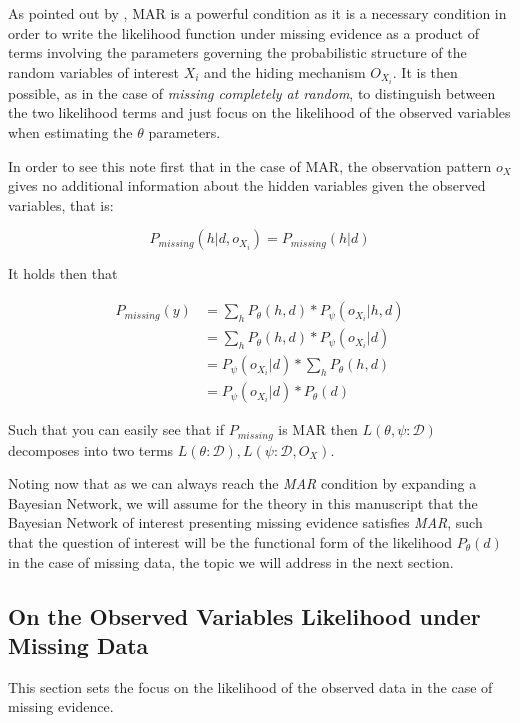 \documentclass[11pt]{article}
\begin{document}
\begin{article}
As pointed out by \cite{koller2009probabilistic}, MAR is a powerful
condition as it is a necessary condition in order to write the
likelihood function under missing evidence as a product of terms
involving the parameters governing the probabilistic structure of
the random variables of interest \(X_i\) and the hiding mechanism
\(O_{X_i}\). It is then possible, as in the case of \emph{missing
completely at random}, to distinguish between the two likelihood
terms and just focus on the likelihood of the observed variables
when estimating the \(\theta\) parameters.

In order to see this note first that in the case of MAR, the
observation pattern \(o_X\) gives no additional information about the
hidden variables given the observed variables, that is:

$$ P_{missing} (h | d, o_{X_i}) =  P_{missing} (h | d) $$

It holds then that 


\begin{align}
P_{missing}(y) &= \sum_h P_{\theta} (h, d) * P_\psi(o_{X_i} | h, d) \nonumber \\
             &= \sum_h P_{\theta} (h, d) * P_\psi(o_{X_i} | d) \nonumber \\
             &= P_\psi(o_{X_i} | d) * \sum_h P_{\theta} (h, d)  \nonumber \\
	     &= P_\psi(o_{X_i} | d) * P_{\theta} (d)  \nonumber		
\end{align}

Such that you can easily see that if \(P_{missing}\) is MAR then
\(L(\theta, \psi : \mathscr{D})\) decomposes into two terms \(L(\theta :
   \mathscr{D}), L(\psi : \mathscr{D}, O_X)\).

Noting now that as we can always reach the \emph{MAR} condition by
expanding a Bayesian Network, we will assume for the theory in this
manuscript that the Bayesian Network of interest presenting missing
evidence satisfies \emph{MAR}, such that the question of interest will
be the functional form of the likelihood \(P_{\theta} (d)\) in the
case of missing data, the topic we will address in the next
section.

\subsection{On the Observed Variables Likelihood under Missing Data}
\label{sec:org7df83e2}

This section sets the focus on the likelihood of the observed data
in the case of missing evidence.


\end{article}
\end{document}

